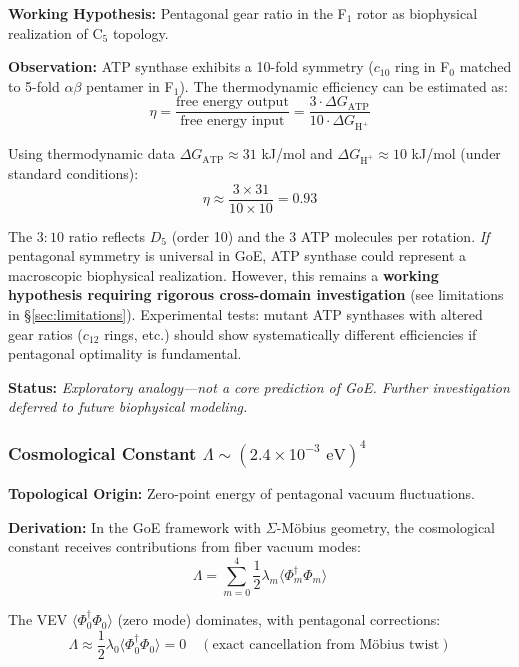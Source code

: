 \documentclass[12pt]{article}
\begin{document}
\textbf{Working Hypothesis:} Pentagonal gear ratio in the F$_1$ rotor as biophysical realization of C$_5$ topology.

\textbf{Observation:} ATP synthase exhibits a 10-fold symmetry ($c_{10}$ ring in F$_0$ matched to 5-fold $\alpha\beta$ pentamer in F$_1$). The thermodynamic efficiency can be estimated as:
\begin{equation}
\eta = \frac{\text{free energy output}}{\text{free energy input}} = \frac{3 \cdot \Delta G_{\text{ATP}}}{10 \cdot \Delta G_{\text{H}^+}}
\end{equation}

Using thermodynamic data $\Delta G_{\text{ATP}} \approx 31$ kJ/mol and $\Delta G_{\text{H}^+} \approx 10$ kJ/mol (under standard conditions):
\begin{equation}
\eta \approx \frac{3 \times 31}{10 \times 10} = 0.93
\end{equation}

The $3:10$ ratio reflects $D_5$ (order 10) and the 3 ATP molecules per rotation. \emph{If} pentagonal symmetry is universal in GoE, ATP synthase could represent a macroscopic biophysical realization. However, this remains a \textbf{working hypothesis requiring rigorous cross-domain investigation} (see limitations in \S\ref{sec:limitations}). Experimental tests: mutant ATP synthases with altered gear ratios ($c_{12}$ rings, etc.) should show systematically different efficiencies if pentagonal optimality is fundamental.

\textbf{Status:} \textit{Exploratory analogy—not a core prediction of GoE. Further investigation deferred to future biophysical modeling.}

\subsubsection{Cosmological Constant $\Lambda \sim (2.4 \times 10^{-3} \text{ eV})^4$}

\textbf{Topological Origin:} Zero-point energy of pentagonal vacuum fluctuations.

\textbf{Derivation:} In the GoE framework with $\Sigma$-M\"obius geometry, the cosmological constant receives contributions from fiber vacuum modes:
\begin{equation}
\Lambda = \sum_{m=0}^4 \frac{1}{2}\lambda_m \langle \Phi_m^\dagger \Phi_m \rangle
\end{equation}

The VEV $\langle \Phi_0^\dagger \Phi_0 \rangle$ (zero mode) dominates, with pentagonal corrections:
\begin{equation}
\Lambda \approx \frac{1}{2} \lambda_0 \langle \Phi_0^\dagger \Phi_0 \rangle = 0 \quad (\text{exact cancellation from M\"obius twist})
\end{equation}
\end{document}
